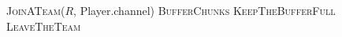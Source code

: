 \documentclass{article}
\begin{document}
\pagestyle{empty}

\newcommand{\send}{\Rightarrow}
\newcommand{\sendto}{\rightarrow}
\algrenewcommand{}

\begin{algorithmic}

  \State \textsc{JoinATeam}($R$, Player.channel)
  \State \textsc{BufferChunks}
  \State \textsc{KeepTheBufferFull}
  \EndWhile
  \State \textsc{LeaveTheTeam}
  \EndProcedure
    
\end{algorithmic}
\end{document}
